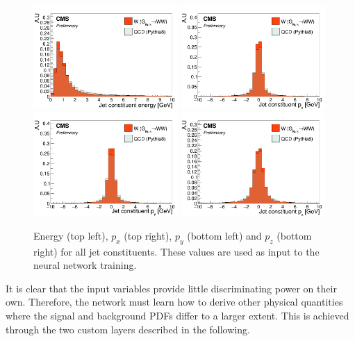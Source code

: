 \begin{figure}[h!]
\centering
\includegraphics[width=0.49\textwidth]{figures/vtagging/AN-18-099/input/inputs/sig-bkg/pe.png}
\includegraphics[width=0.49\textwidth]{figures/vtagging/AN-18-099/input/inputs/sig-bkg/ppx.png}\\
\includegraphics[width=0.49\textwidth]{figures/vtagging/AN-18-099/input/inputs/sig-bkg/ppy.png}
\includegraphics[width=0.49\textwidth]{figures/vtagging/AN-18-099/input/inputs/sig-bkg/ppz.png}
\caption{Energy (top left), $p_x$ (top right), $p_y$ (bottom left) and $p_z$ (bottom right) for all jet constituents. These values are used as input to the neural network training.}
\label{fig:lola:inputs}
\end{figure}
It is clear that the input variables provide little discriminating power on their own. Therefore, the network must learn how to derive other physical quantities where the signal and background PDFs differ to a larger extent. This is achieved through the two custom layers described in the following.

